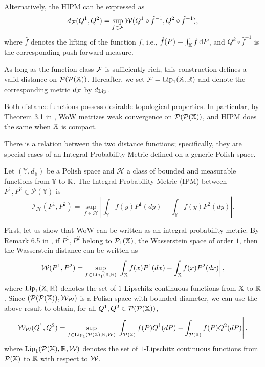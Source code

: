 Alternatively, the HIPM can be expressed as
\[
d_{\mathcal{F}}(Q^1, Q^2) = \sup_{f \in \mathcal{F}} \mathcal{W}(Q^1 \circ \hat{f}^{-1}, Q^2 \circ \hat{f}^{-1}),
\]
where $\hat{f}$ denotes the lifting of the function $f$, i.e., $\hat{f}(P) = \int_{\mathbb{X}} f \, \mathrm{d}P$, and $Q^k \circ \hat{f}^{-1}$ is the corresponding push-forward measure.

As long as the function class $\mathcal{F}$ is sufficiently rich, this construction defines a valid distance on $\mathcal{P}(\mathcal{P}(\mathbb{X}))$. Hereafter, we set $\mathcal{F} = \mathrm{Lip}_1(\mathbb{X},\mathbb{R})$ and denote the corresponding metric $d_{\mathcal{F}}$ by $d_{\mathrm{Lip}}$.

Both distance functions possess desirable topological properties. In particular, by Theorem 3.1 in \cite{catalano2024hierarchical}, WoW metrizes weak convergence on $\mathcal{P}(\mathcal{P}(\mathbb{X}))$, and HIPM does the same when $\mathbb{X}$ is compact.

There is a relation between the two distance functions; specifically, they are special cases of an Integral Probability Metric defined on a generic Polish space.
\begin{definition}
    \label{definition:ipm}
    Let $(\mathbb{Y},d_{\mathbb{Y}})$ be a Polish space and $\mathcal{H}$ a class of bounded and measurable functions from $\mathbb{Y}$ to $\mathbb{R}$. The Integral Probability Metric (IPM) between $P^1, P^2 \in \mathcal{P}\left(\mathbb{Y}\right)$ is
    \[
    \mathcal{I}_{\mathcal{H}}(P^1,P^2) = \sup_{f\in\mathcal{H}} \left| \int_{\mathbb{Y}} f(y) P^1(dy) - \int_{\mathbb{Y}} f(y) P^2(dy) \right|.
    \]
\end{definition}
First, let us show that WoW can be written as an integral probability metric. By Remark 6.5 in \cite{villani2008optimal}, if $P^1,P^2$ belong to $\mathcal{P}_1(\mathbb{X})$, the Wasserstein space of order $1$, then the Wasserstein distance can be written as
\begin{equation}\label{equation:wow_is_ipm}
\mathcal{W}(P^1,P^2) = \sup_{f\in \mathrm{Lip}_1(\mathbb{X},\mathbb{R})} \left| \int_{\mathbb{X}} f(x) P^1(dx) - \int_{\mathbb{X}} f(x) P^2(dx) \right|,
\end{equation}
where $\mathrm{Lip}_1(\mathbb{X},\mathbb{R})$ denotes the set of $1$-Lipschitz continuous functions from $\mathbb{X}$ to $\mathbb{R}$. Since $(\mathcal{P}(\mathcal{P}(\mathbb{X})), \mathcal{W}_{\mathcal{W}})$ is a Polish space with bounded diameter, we can use the above result to obtain, for all $Q^1,Q^2\in\mathcal{P}(\mathcal{P}(\mathbb{X}))$,
\[
\mathcal{W}_{\mathcal{W}}(Q^1,Q^2) = \sup_{f\in \mathrm{Lip}_1(\mathcal{P}(\mathbb{X}),\mathbb{R}, \mathcal{W})} \left| \int_{\mathcal{P}(\mathbb{X})} f(P) Q^1(dP) - \int_{\mathcal{P}(\mathbb{X})} f(P) Q^2(dP) \right|,
\]
where $\mathrm{Lip}_1(\mathcal{P}(\mathbb{X}),\mathbb{R}, \mathcal{W})$ denotes the set of $1$-Lipschitz continuous functions from $\mathcal{P}(\mathbb{X})$ to $\mathbb{R}$ with respect to $\mathcal{W}$.

